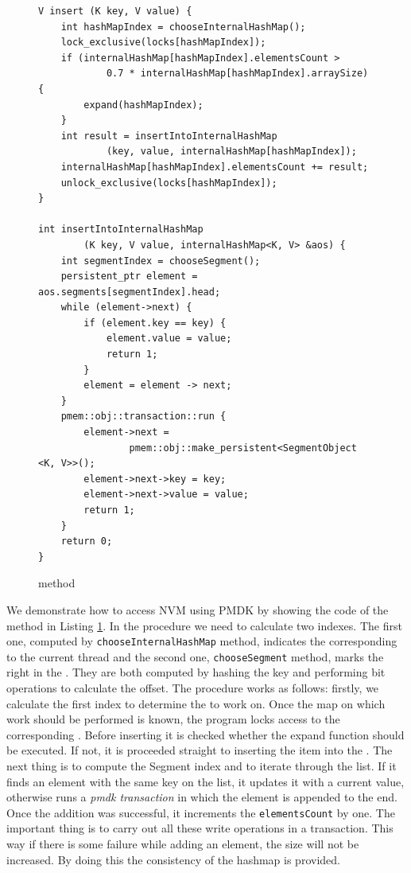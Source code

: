 \begin{figure}[ht]
\renewcommand{\figurename}{Listing}
\begin{lstlisting}
V insert (K key, V value) {
    int hashMapIndex = chooseInternalHashMap();
    lock_exclusive(locks[hashMapIndex]);
    if (internalHashMap[hashMapIndex].elementsCount > 
            0.7 * internalHashMap[hashMapIndex].arraySize) {
        expand(hashMapIndex);
    }
    int result = insertIntoInternalHashMap
            (key, value, internalHashMap[hashMapIndex]);
    internalHashMap[hashMapIndex].elementsCount += result;
    unlock_exclusive(locks[hashMapIndex]);
}
    
int insertIntoInternalHashMap
        (K key, V value, internalHashMap<K, V> &aos) {
    int segmentIndex = chooseSegment();
    persistent_ptr element = aos.segments[segmentIndex].head;
    while (element->next) {
        if (element.key == key) {
            element.value = value;
            return 1;
        } 
        element = element -> next;
    }
    pmem::obj::transaction::run {
        element->next = 
                pmem::obj::make_persistent<SegmentObject <K, V>>();
        element->next->key = key;
        element->next->value = value;
        return 1;
    }
    return 0;
}
\end{lstlisting}
\renewcommand{\figurename}{Listing}
\caption{\insertMethod method}
\label{insertMethod}
\end{figure}
    
    We demonstrate how to access NVM using PMDK by showing the code of the \insertMethod method in Listing \ref{insertMethod}.
    In the procedure we need to calculate two indexes.
    The first one, computed by \texttt{choose\-Internal\-HashMap} method, indicates the \internalHashMap corresponding to the current thread and the second one, \texttt{choose\-Segment} method, marks the right \Segment in the \internalHashMap. 
    They are both computed by hashing the key and performing bit operations to calculate the offset.
    The procedure works as follows: firstly, we calculate the first index to determine the \internalHashMap to work on.  
    Once the map on which work should be performed is known, the program locks access to the corresponding \internalHashMap. 
    Before inserting it is checked whether the expand function should be executed. 
    If not, it is proceeded straight to inserting the item into the \internalHashMap. 
    The next thing is to compute the Segment index and to iterate through the list. 
    If it finds an element with the same key on the list, it updates it with a current value, otherwise runs a \textit{pmdk transaction} in which the element is appended to the end.
    Once the addition was successful, it increments the \texttt{elementsCount} by one. The important thing is to carry out all these write operations in a transaction. 
    This way if there is some failure while adding an element, the size will not be increased. By doing this the consistency of the hashmap is provided.
        
